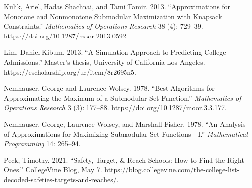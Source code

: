 \documentclass[11pt]{article} %
\theoremstyle{definition}
\begin{document}
%
Kulik, Ariel, Hadas Shachnai, and Tami Tamir. 2013. ``Approximations for Monotone and Nonmonotone Submodular Maximization with Knapsack Constraints.'' \emph{Mathematics of Operations Research} 38 (4): 729--39. \url{https://doi.org/10.1287/moor.2013.0592}.

Lim, Daniel Kibum. 2013. ``A Simulation Approach to Predicting College Admissions.'' Master's thesis, University of California Los Angeles. \url{https://escholarship.org/uc/item/8r2695n5}.

%
%
%
Nemhauser, George and Laurence Wolsey. 1978. ``Best Algorithms for Approximating the Maximum of a Submodular Set Function.'' \emph{Mathematics of Operations Research} 3 (3): 177--88. \url{https://doi.org/10.1287/moor.3.3.177}.

Nemhauser, George, Laurence Wolsey, and Marshall Fisher. 1978. ``An Analysis of Approximations for Maximizing Submodular Set Functions—I.'' \emph{Mathematical Programming} 14: 265--94. 

%

Peck, Timothy. 2021. ``Safety, Target, \& Reach Schools: How to Find the Right Ones.'' CollegeVine Blog, May 7. \url{https://blog.collegevine.com/the-college-list-decoded-safeties-targets-and-reaches/}.
\end{document}
